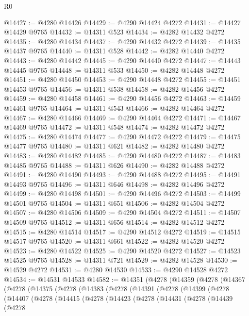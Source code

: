 \begin{lexlean}{R0}
\begin{coremodule}
@14427 := @4280 @14426
@14429 := @4290 @14424 @4272
@14431 := @14427 @14429 @9765
@14432 := @14311 @523
@14434 := @4282 @14432 @4272
@14435 := @4280 @14434
@14437 := @4290 @14432 @4272
@14439 := @14435 @14437 @9765
@14440 := @14311 @528
@14442 := @4282 @14440 @4272
@14443 := @4280 @14442
@14445 := @4290 @14440 @4272
@14447 := @14443 @14445 @9765
@14448 := @14311 @533
@14450 := @4282 @14448 @4272
@14451 := @4280 @14450
@14453 := @4290 @14448 @4272
@14455 := @14451 @14453 @9765
@14456 := @14311 @538
@14458 := @4282 @14456 @4272
@14459 := @4280 @14458
@14461 := @4290 @14456 @4272
@14463 := @14459 @14461 @9765
@14464 := @14311 @543
@14466 := @4282 @14464 @4272
@14467 := @4280 @14466
@14469 := @4290 @14464 @4272
@14471 := @14467 @14469 @9765
@14472 := @14311 @548
@14474 := @4282 @14472 @4272
@14475 := @4280 @14474
@14477 := @4290 @14472 @4272
@14479 := @14475 @14477 @9765
@14480 := @14311 @621
@14482 := @4282 @14480 @4272
@14483 := @4280 @14482
@14485 := @4290 @14480 @4272
@14487 := @14483 @14485 @9765
@14488 := @14311 @626
@14490 := @4282 @14488 @4272
@14491 := @4280 @14490
@14493 := @4290 @14488 @4272
@14495 := @14491 @14493 @9765
@14496 := @14311 @646
@14498 := @4282 @14496 @4272
@14499 := @4280 @14498
@14501 := @4290 @14496 @4272
@14503 := @14499 @14501 @9765
@14504 := @14311 @651
@14506 := @4282 @14504 @4272
@14507 := @4280 @14506
@14509 := @4290 @14504 @4272
@14511 := @14507 @14509 @9765
@14512 := @14311 @656
@14514 := @4282 @14512 @4272
@14515 := @4280 @14514
@14517 := @4290 @14512 @4272
@14519 := @14515 @14517 @9765
@14520 := @14311 @661
@14522 := @4282 @14520 @4272
@14523 := @4280 @14522
@14525 := @4290 @14520 @4272
@14527 := @14523 @14525 @9765
@14528 := @14311 @721
@14529 := @4282 @14528
@14530 := @14529 @4272
@14531 := @4280 @14530
@14533 := @4290 @14528 @4272
@14534 := @14531 @14533
@14582 := @14351
    (@4278
      (@14359
        (@4278
          (@14367
            (@4278
              (@14375
                (@4278
                  (@14383
                    (@4278
                      (@14391
                        (@4278
                          (@14399
                            (@4278
                              (@14407
                                (@4278
                                  (@14415
                                    (@4278
                                      (@14423
                                        (@4278
                                          (@14431
                                            (@4278
                                              (@14439
                                                (@4278

\end{coremodule}
\end{lexlean}
